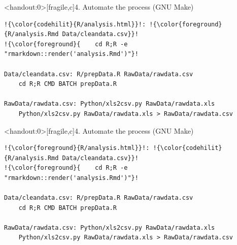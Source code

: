 \documentclass[12pt,t]{beamer}
\begin{document}
\begin{frame}<handout:0>[fragile,c]{4. Automate the process (GNU Make)}

\addtocounter{framenumber}{-1}

\begin{center}
\begin{minipage}[c]{10.8cm}
\begin{semiverbatim}
\begin{lstlisting}[escapechar=!,linewidth=10.8cm]
!{\color{codehilit}{R/analysis.html}}!: !{\color{foreground}{R/analysis.Rmd Data/cleandata.csv}}!
!{\color{foreground}{    cd R;R -e "rmarkdown::render('analysis.Rmd')"}!

Data/cleandata.csv: R/prepData.R RawData/rawdata.csv
    cd R;R CMD BATCH prepData.R

RawData/rawdata.csv: Python/xls2csv.py RawData/rawdata.xls
    Python/xls2csv.py RawData/rawdata.xls > RawData/rawdata.csv
\end{lstlisting}
\end{semiverbatim}
\end{minipage}
\end{center}

\end{frame}



\begin{frame}<handout:0>[fragile,c]{4. Automate the process (GNU Make)}

\addtocounter{framenumber}{-1}

\begin{center}
\begin{minipage}[c]{10.8cm}
\begin{semiverbatim}
\begin{lstlisting}[escapechar=!,linewidth=10.8cm]
!{\color{foreground}{R/analysis.html}}!: !{\color{codehilit}{R/analysis.Rmd Data/cleandata.csv}}!
!{\color{foreground}{    cd R;R -e "rmarkdown::render('analysis.Rmd')"}!

Data/cleandata.csv: R/prepData.R RawData/rawdata.csv
    cd R;R CMD BATCH prepData.R

RawData/rawdata.csv: Python/xls2csv.py RawData/rawdata.xls
    Python/xls2csv.py RawData/rawdata.xls > RawData/rawdata.csv
\end{lstlisting}
\end{semiverbatim}
\end{minipage}
\end{center}
\end{frame}
\end{document}
